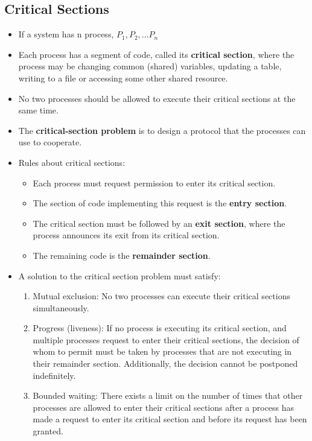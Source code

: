 \documentclass[10pt]{report}
\begin{document}
\subsection{Critical Sections}
\begin{itemize}
\item If a system has n process, $P_1, P_2, ... P_n$
\item Each process has a segment of code, called its \textbf{critical section}, where the process may be changing common (shared) variables, updating a table, writing to a file or accessing some other shared resource.
\item No two processes should be allowed to execute their critical sections at the same time.
\item The \textbf{critical-section problem} is to design a protocol that the processes can use to cooperate.
\item Rules about critical sections:
\begin{itemize}
\item Each process must request permission to enter its critical section.
\item The section of code implementing this request is the \textbf{entry section}.
\item The critical section must be followed by an \textbf{exit section}, where the process announces its exit from its critical section.
\item The remaining code is the \textbf{remainder section}.
\end{itemize}
\item A solution to the critical section problem must satisfy:
\begin{enumerate}
\item Mutual exclusion: No two processes can execute their critical sections simultaneously.
\item Progress (liveness): If no process is executing its critical section, and multiple processes request to enter their critical sections, the decision of whom to permit must be taken by processes that are not executing in their remainder section. Additionally, the decision cannot be postponed indefinitely.
\item Bounded waiting: There exists a limit on the number of times that other processes are allowed to enter their critical sections after a process has made a request to enter its critical section and before its request has been granted.
\end{enumerate}
\end{itemize}
\end{document}
